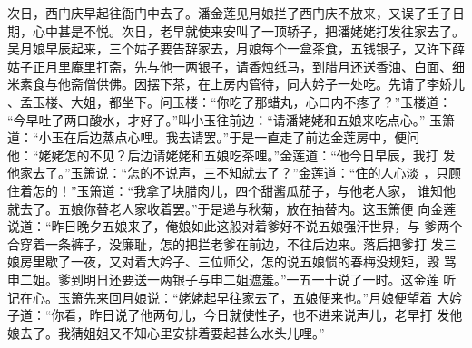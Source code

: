 次日，西门庆早起往衙门中去了。潘金莲见月娘拦了西门庆不放来，又误了壬子日
期，心中甚是不悦。次日，老早就使来安叫了一顶轿子，把潘姥姥打发往家去了。
吴月娘早辰起来，三个姑子要告辞家去，月娘每个一盒茶食，五钱银子，又许下薛
姑子正月里庵里打斋，先与他一两银子，请香烛纸马，到腊月还送香油、白面、细
米素食与他斋僧供佛。因摆下茶，在上房内管待，同大妗子一处吃。先请了李娇儿
、孟玉楼、大姐，都坐下。问玉楼：“你吃了那蜡丸，心口内不疼了？”玉楼道：
“今早吐了两口酸水，才好了。”叫小玉往前边：“请潘姥姥和五娘来吃点心。”
玉箫道：“小玉在后边蒸点心哩。我去请罢。”于是一直走了前边金莲房中，便问
他：“姥姥怎的不见？后边请姥姥和五娘吃茶哩。”金莲道：“他今日早辰，我打
发他家去了。”玉箫说：“怎的不说声，三不知就去了？”金莲道：“住的人心淡
，只顾住着怎的！”玉箫道：“我拿了块腊肉儿，四个甜酱瓜茄子，与他老人家，
谁知他就去了。五娘你替老人家收着罢。”于是递与秋菊，放在抽替内。这玉箫便
向金莲说道：“昨日晚夕五娘来了，俺娘如此这般对着爹好不说五娘强汗世界，与
爹两个合穿着一条裤子，没廉耻，怎的把拦老爹在前边，不往后边来。落后把爹打
发三娘房里歇了一夜，又对着大妗子、三位师父，怎的说五娘惯的春梅没规矩，毁
骂申二姐。爹到明日还要送一两银子与申二姐遮羞。”一五一十说了一时。这金莲
听记在心。玉箫先来回月娘说：“姥姥起早往家去了，五娘便来也。”月娘便望着
大妗子道：“你看，昨日说了他两句儿，今日就使性子，也不进来说声儿，老早打
发他娘去了。我猜姐姐又不知心里安排着要起甚么水头儿哩。”

